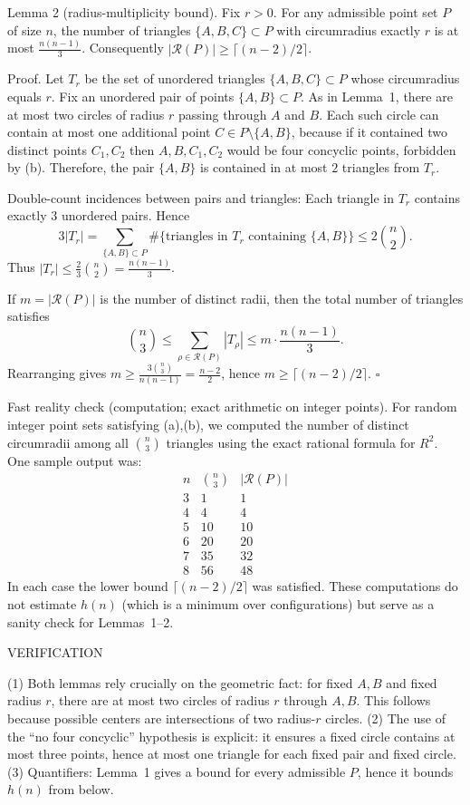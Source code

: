 Lemma 2 (radius-multiplicity bound).
Fix $r>0$.
For any admissible point set $P$ of size $n$, the number of triangles $\{A,B,C\}\subset P$ with circumradius exactly $r$ is at most $\frac{n(n-1)}{3}$.
Consequently $|\mathcal{R}(P)|\ge \lceil (n-2)/2\rceil$.

Proof.
Let $T_r$ be the set of unordered triangles $\{A,B,C\}\subset P$ whose circumradius equals $r$.
Fix an unordered pair of points $\{A,B\}\subset P$.
As in Lemma~1, there are at most two circles of radius $r$ passing through $A$ and $B$.
Each such circle can contain at most one additional point $C\in P\setminus\{A,B\}$, because if it contained two distinct points $C_1,C_2$ then $A,B,C_1,C_2$ would be four concyclic points, forbidden by (b).
Therefore, the pair $\{A,B\}$ is contained in at most $2$ triangles from $T_r$.

Double-count incidences between pairs and triangles:
Each triangle in $T_r$ contains exactly $3$ unordered pairs.
Hence
\[
3|T_r| = \sum_{\{A,B\}\subset P} \#\{\text{triangles in }T_r\text{ containing }\{A,B\}\} \le 2\binom{n}{2}.
\]
Thus $|T_r|\le \frac{2}{3}\binom{n}{2}=\frac{n(n-1)}{3}$.

If $m=|\mathcal{R}(P)|$ is the number of distinct radii, then the total number of triangles satisfies
\[
\binom{n}{3} \le \sum_{\rho\in\mathcal{R}(P)} |T_{\rho}| \le m\cdot \frac{n(n-1)}{3}.
\]
Rearranging gives $m\ge \frac{3\binom{n}{3}}{n(n-1)}=\frac{n-2}{2}$, hence $m\ge \lceil (n-2)/2\rceil$.
$\square$

Fast reality check (computation; exact arithmetic on integer points).
For random integer point sets satisfying (a),(b), we computed the number of distinct circumradii among all $\binom{n}{3}$ triangles using the exact rational formula for $R^2$.
One sample output was:
\[
\begin{array}{r|r|r}
 n & \binom{n}{3} & |\mathcal{R}(P)| \\\hline
 3 & 1 & 1\\
 4 & 4 & 4\\
 5 & 10 & 10\\
 6 & 20 & 20\\
 7 & 35 & 32\\
 8 & 56 & 48
\end{array}
\]
In each case the lower bound $\lceil (n-2)/2\rceil$ was satisfied.
These computations do not estimate $h(n)$ (which is a minimum over configurations) but serve as a sanity check for Lemmas~1--2.

VERIFICATION

(1) Both lemmas rely crucially on the geometric fact: for fixed $A,B$ and fixed radius $r$, there are at most two circles of radius $r$ through $A,B$. This follows because possible centers are intersections of two radius-$r$ circles.
(2) The use of the “no four concyclic” hypothesis is explicit: it ensures a fixed circle contains at most three points, hence at most one triangle for each fixed pair and fixed circle.
(3) Quantifiers: Lemma~1 gives a bound for every admissible $P$, hence it bounds $h(n)$ from below.


